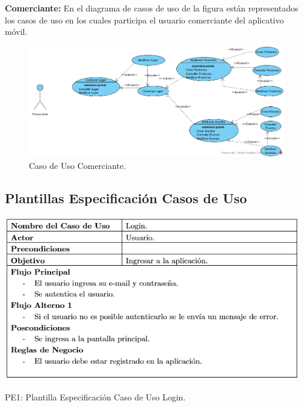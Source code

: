 \documentclass[12pt,letterpaper,openany]{book}
\begin{document}
\textbf{Comerciante:} En el diagrama de casos de uso de la figura están representados los casos de uso en los cuales participa el usuario comerciante del aplicativo móvil.
\begin{figure}[H]
\begin{center}
\includegraphics[width=13cm]{./imagenes/CU/cu_comerciante}
\caption{Caso de Uso Comerciante.}
\end{center}
\end{figure}

\subsection{Plantillas Especificación Casos de Uso}
\begin{table}[H]
\centering
\includegraphics[width=13cm]{./imagenes/PCU/login}
\caption{PE1: Plantilla Especificación Caso de Uso Login.}
\end{table}
\end{document}

